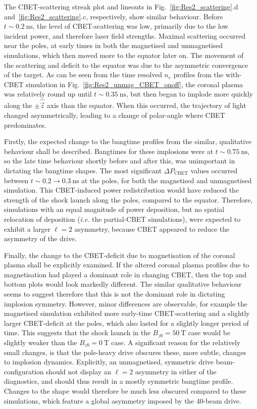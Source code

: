 The \ac{CBET}-scattering streak plot and lineouts in Fig.~\ref{fig:Res2_scattering}.d and~\ref{fig:Res2_scattering}.c, respectively, show similar behaviour.
Before $t\sim0.2\ \text{ns}$, the level of \ac{CBET}-scattering was low, primarily due to the low incident power, and therefore laser field strengths.
Maximal scattering occurred near the poles, at early times in both the magnetised and unmagnetised simulations, which then moved more to the equator later on.
The movement of the scattering and deficit to the equator was due to the asymmetric convergence of the target.
As can be seen from the time resolved $n_e$ profiles from the with-\ac{CBET} simulation in Fig.~\ref{fig:Res2_unmag_CBET_onoff}, the coronal plasma was relatively round up until $t\sim0.35\ \text{ns}$, but then began to implode more quickly along the $\pm\hat{\vec{z}}$ axis than the equator.
When this occurred, the trajectory of light changed asymmetrically, leading to a change of polar-angle where \ac{CBET} predominates.

Firstly, the expected change to the bangtime profiles from the similar, qualitative behaviour shall be described.
Bangtimes for these implosions were at $t\sim0.75\ \text{ns}$, so the late time behaviour shortly before and after this, was unimportant in dictating the bangtime shapes.
The most significant $\Delta P_{\text{CBET}}$ values occurred between $t\sim0.2\rightarrow0.3\ \text{ns}$ at the poles, for both the magnetised and unmagnetised simulation.
This \ac{CBET}-induced power redistribution would have reduced the strength of the shock launch along the poles, compared to the equator.
Therefore, simulations with an equal magnitude of power deposition, but no spatial relocation of deposition (\textit{i.e.} the partial-\ac{CBET} simulations), were expected to exhibit a larger $\ell=2$ asymmetry, because \ac{CBET} appeared to reduce the asymmetry of the drive.

Finally, the change to the \ac{CBET}-deficit due to magnetisation of the coronal plasma shall be explicitly examined.
If the altered coronal plasma profiles due to magnetisation had played a dominant role in changing \ac{CBET}, then the top and bottom plots would look markedly different.
The similar qualitative behaviour seems to suggest therefore that this is not the dominant role in dictating implosion symmetry.
However, minor differences are observable, for example the magnetised simulation exhibited more early-time \ac{CBET}-scattering and a slightly larger \ac{CBET}-deficit at the poles, which also lasted for a slightly longer period of time.
This suggests that the shock launch in the $B_{z0}=50\ \text{T}$ case would be slightly weaker than the $B_{z0}=0\ \text{T}$ case.
A significant reason for the relatively small changes, is that the pole-heavy drive obscures these, more subtle, changes to implosion dynamics.
Explicitly, an unmagnetised, symmetric drive beam-configuration should not display an $\ell=2$ asymmetry in either of the diagnostics, and should thus result in a mostly symmetric bangtime profile.
Changes to the shape would therefore be much less obscured compared to these simulations, which feature a global asymmetry imposed by the 40-beam drive.

